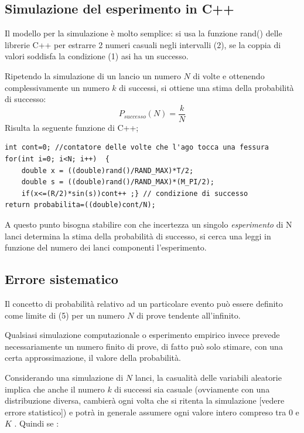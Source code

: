 \documentclass{article}
\begin{document}
\subsection{Simulazione del esperimento in C++}

Il modello per la simulazione è molto semplice: si usa la funzione rand() delle librerie C++ per estrarre 2 numeri casuali negli intervalli (2), se la coppia di valori soddisfa la condizione (1) asi ha un successo.

Ripetendo la simulazione di un lancio un numero $N$ di volte e ottenendo complessivamente un numero $k$ di successi, si ottiene una stima della probabilità di successo:
	\begin{equation}
	P_{successo}(N)=\dfrac{k}{N}
	\end{equation}
Risulta la seguente funzione di C++;

\begin{lstlisting}[frame=single]
int cont=0; //contatore delle volte che l'ago tocca una fessura
for(int i=0; i<N; i++)	{ 
	double x = ((double)rand()/RAND_MAX)*T/2;
	double s = ((double)rand()/RAND_MAX)*(M_PI/2);
	if(x<=(R/2)*sin(s))cont++ ;} // condizione di successo
return probabilita=((double)cont/N); 
\end{lstlisting}

A questo punto bisogna stabilire con che incertezza un singolo \emph{esperimento} di N lanci determina la stima della probabilità di successo, si cerca una leggi in funzione del numero dei lanci componenti l'esperimento.

\subsection{Errore sistematico}

Il concetto di probabilità relativo ad un particolare evento può essere definito come limite  di (5) per un numero $N$ di prove tendente all'infinito.

Qualsiasi simulazione computazionale o esperimento empirico invece prevede necessariamente un numero finito di prove, di fatto può solo stimare, con una certa approssimazione, il valore della probabilità.

Considerando una simulazione di $N$ lanci, la casualità delle variabili aleatorie implica che anche il numero $k$ di successi sia casuale (ovviamente con una distribuzione diversa, cambierà ogni volta che si ritenta la simulazione [vedere errore statistico]) e potrà in generale assumere ogni valore intero compreso tra $0$ e$K$ .
Quindi se :
\end{document}
